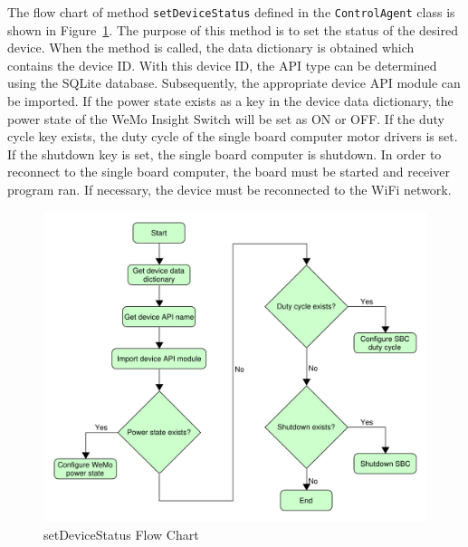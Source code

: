 \documentclass[conference]{IEEEtran}
\begin{document}
The flow chart of method \texttt{setDeviceStatus} defined in the \texttt{ControlAgent} class is shown in
Figure~\ref{fig:setDeviceStatus}. The purpose of this method is to set the
status of the desired device. When the method is called, the data dictionary is
obtained which contains the device ID. With this device ID, the API type can be
determined using the SQLite database. Subsequently, the appropriate device API
module can be imported. If the power state exists as a key in the device data
dictionary, the power state of the WeMo Insight Switch will be set as ON or OFF.
If the duty cycle key exists, the duty cycle of the single board computer motor
drivers is set. If the shutdown key is set, the single board computer is
shutdown. In order to reconnect to the single board computer, the board must be
started and receiver program ran. If necessary, the device must be reconnected
to the WiFi network. %

\begin{figure}[htbp]
    \centering
    \includegraphics[scale=0.3]{figs/agents/setDeviceStatus.pdf}
    \caption{setDeviceStatus Flow Chart}
    \label{fig:setDeviceStatus}
\end{figure}
\end{document}
